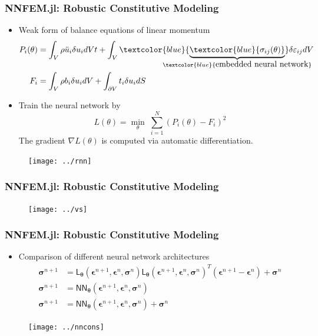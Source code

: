 \documentclass{beamer}
\newcommand{\ChoL}{\mathsf{L}}
\newcommand{\bt}[0]{\bm{\theta}}
\begin{document}
\begin{frame}
	\frametitle{NNFEM.jl: Robustic Constitutive Modeling}
	\begin{itemize}
	 \item Weak form of balance equations of linear momentum 
	{\footnotesize
	\begin{align*}
		P_i(\theta) &= \int_V \rho \ddot u_i \delta u_i dVt + \int_{V} \textcolor{blue}{\underbrace{\textcolor{blue}{\sigma_{ij}(\theta)}}_{\mathclap{\textcolor{blue}{\mbox{embedded neural network}}}}} \delta \varepsilon_{ij}dV\\
		F_i &= \int_{V}\rho b_i \delta u_i dV + \int_{\partial V} t_i\delta u_idS
	\end{align*}
	}
	\item Train the neural network by 
	{\scriptsize $$\boxed{L(\theta) = \min_{\theta}\;\sum_{i=1}^N(P_i(\theta) - F_i)^2}$$}
	The gradient $\nabla L(\theta)$ is computed via automatic differentiation.
	\end{itemize}
	\begin{figure}[hbt]
  \texttt{[image: ../rnn]}
\end{figure}

\end{frame}

\begin{frame}
	\frametitle{NNFEM.jl: Robustic Constitutive Modeling}
\begin{figure}[hbt]
  \texttt{[image: ../vs]}
\end{figure}
\end{frame}


\begin{frame}
	\frametitle{NNFEM.jl: Robustic Constitutive Modeling}
	\begin{itemize}
		\item Comparison of different neural network architectures 
		\begin{align*}
			\bm\sigma^{n+1} &= \ChoL_{\bt}(\bm\epsilon^{n+1},\bm{\epsilon}^{n},\bm{\sigma}^{n}) \ChoL_{\bt}(\bm\epsilon^{n+1},\bm{\epsilon}^{n},\bm{\sigma}^{n})^T (\bm{\epsilon}^{n+1} - \bm{\epsilon}^{n})  + \bm{\sigma}^{n} \\
			\bm{\sigma}^{n+1} &=  \mathsf{NN}_{\bt}(\bm\epsilon^{n+1},\bm{\epsilon}^{n},\bm{\sigma}^{n})\\
			\bm{\sigma}^{n+1} &=  \mathsf{NN}_{\bt}(\bm\epsilon^{n+1},\bm{\epsilon}^{n},\bm{\sigma}^{n}) + \bm{\sigma}^{n}
		\end{align*}
	\end{itemize}
\begin{figure}[hbt]
  \texttt{[image: ../nncons]}
\end{figure}
\end{frame}
\end{document}
